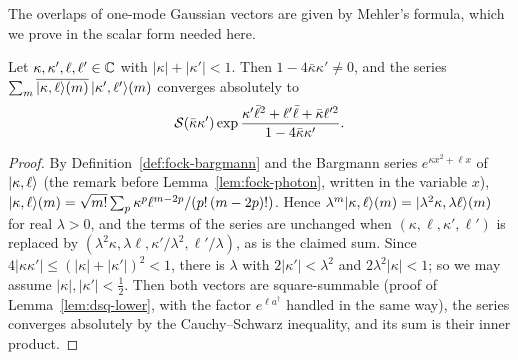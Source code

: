 \begin{veteenv}
The overlaps of one-mode Gaussian vectors are given by Mehler's formula, which we prove in the scalar form needed here.

\begin{lemma}\label{lem:dsq-mehler}
Let $\kappa,\kappa',\ell,\ell'\in\mathbb C$ with $\lvert\kappa\rvert+\lvert\kappa'\rvert<1$. Then $1-4\bar\kappa\kappa'\ne0$, and the series
$\sum_m\overline{\lvert \kappa,\ell\rangle(m)}\,\lvert \kappa',\ell'\rangle(m)$ converges absolutely to
\[
 \mathcal S(\bar\kappa\kappa')\exp\frac{\kappa'\bar\ell^2+\ell'\bar\ell+\bar\kappa\ell'^2}{1-4\bar\kappa\kappa'} .
\]
\end{lemma}

\begin{proof}
By Definition~\ref{def:fock-bargmann} and the Bargmann series $e^{\kappa x^2+\ell x}$ of $\lvert \kappa,\ell\rangle$ (the remark before
Lemma~\ref{lem:fock-photon}, written in the variable $x$), $\lvert \kappa,\ell\rangle(m)=\sqrt{m!}\sum_p\kappa^p\ell^{m-2p}/(p!\,(m-2p)!)$. Hence
$\lambda^m\lvert \kappa,\ell\rangle(m)=\lvert \lambda^2\kappa,\lambda\ell\rangle(m)$ for real $\lambda>0$, and the terms of the series are unchanged when
$(\kappa,\ell,\kappa',\ell')$ is replaced by $(\lambda^2\kappa,\lambda\ell,\kappa'/\lambda^2,\ell'/\lambda)$, as is the claimed sum. Since
$4\lvert\kappa\kappa'\rvert\le(\lvert\kappa\rvert+\lvert\kappa'\rvert)^2<1$, there is $\lambda$ with $2\lvert\kappa'\rvert<\lambda^2$ and
$2\lambda^2\lvert\kappa\rvert<1$; so we may assume $\lvert\kappa\rvert,\lvert\kappa'\rvert<\frac12$. Then both vectors are square-summable
(proof of Lemma~\ref{lem:dsq-lower}, with the factor $e^{\ell a^\dagger}$ handled in the same way), the series converges
absolutely by the Cauchy--Schwarz inequality, and its sum is their inner product.


\end{proof}
\end{veteenv}
